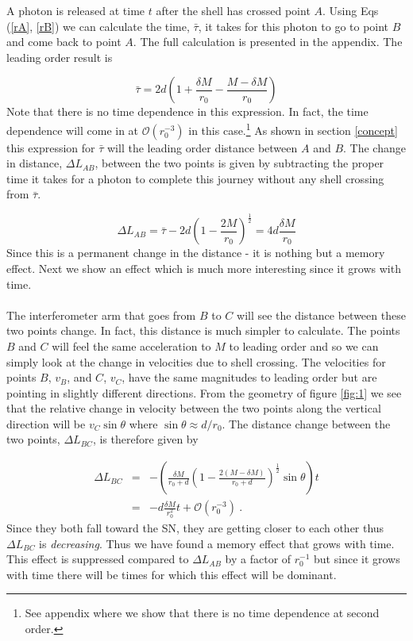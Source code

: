 \documentclass[aps,showpacs,onecolumn,floats,prd,superscriptaddress,nofootinbib]{revtex4-1}
\begin{document}
 A photon is released at time $t$ after the shell has crossed point $A$. Using Eqs (\ref{rA}, \ref{rB}) we can calculate the time, $\bar{\tau}$, it takes for this photon to go to point $B$ and come back to point $A$. The full calculation is presented in the appendix. The leading order result is
 
 \begin{equation}
	 \bar{\tau} = 2d \left( 1 + \frac{\delta M}{r_0} - \frac{M - \delta M}{r_0} \right)
\end{equation}
Note that there is no time dependence in this expression. In fact, the time dependence will come in at $\mathcal{O}(r_0^{-3})$ in this case.\footnote{See appendix where we show that there is no time dependence at second order.} As shown in section \ref{concept} this expression for $\bar{\tau}$ will the leading order distance between $A$ and $B$. The change in distance, $\Delta L_{AB}$, between the two points is given by subtracting the proper time it takes for a photon to complete this journey without any shell crossing from $\bar{\tau}$.

\begin{equation}
	\Delta L_{AB} = \bar{\tau} - 2d \left( 1 - \frac{2M}{r_0} \right)^\frac{1}{2} = 4 d \frac{\delta M}{r_0} 
\end{equation}
Since this is a permanent change in the distance - it is nothing but a memory effect. Next we show an effect which is much more interesting since it grows with time.
\\
\\
The interferometer arm that goes from $B$ to $C$ will see the distance between these two points change. In fact, this distance is much simpler to calculate. The points $B$ and $C$ will feel the same acceleration to $M$ to leading order and so we can simply look at the change in velocities due to shell crossing. The velocities for points $B$, $v_B$, and $C$, $v_C$, have the same magnitudes to leading order but are pointing in slightly different directions. From the geometry of figure \ref{fig:1} we see that the relative change in velocity between the two points along the vertical direction will be $v_C \sin \theta$ where $\sin \theta \approx d/r_0$. The distance change between the two points, $\Delta L_{BC}$, is therefore given by 

\begin{eqnarray}
	\Delta L_{BC} &=& -\left( \frac{ \delta M}{r_0 + d} \left( 1 - \frac{2(M- \delta M)}{r_0+d} \right)^\frac{1}{2}\sin \theta \right) t 
	\nonumber \\
	&=& - d \frac{\delta M}{r_0^2} t + \mathcal{O}(r_0^{-3})~.
\end{eqnarray}
Since they both fall toward the SN, they are getting closer to each other thus $\Delta L_{BC}$ is \emph{decreasing}. Thus we have found a memory effect that grows with time. This effect is suppressed compared to $\Delta L_{AB}$ by a factor of $r_0^{-1}$ but since it grows with time there will be times for which this effect will be dominant.
\end{document}
